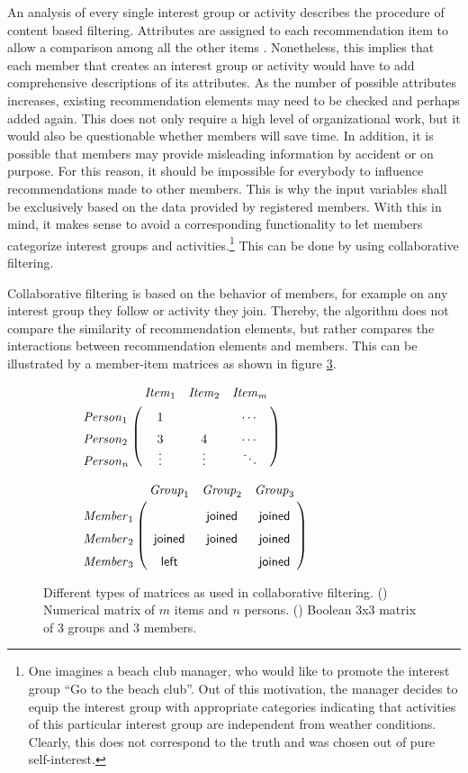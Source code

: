\documentclass[12pt,numbers=noenddot,parskip,bibliography=totocnumbered,listof=totocnumbered,draft]{scrreprt}
\begin{document}
An analysis of every single interest group or activity describes the procedure of content based filtering. Attributes are assigned to each recommendation item to allow a comparison among all the other items \citep[p.42]{klahold2009}. Nonetheless, this implies that each member that creates an interest group or activity would have to add comprehensive descriptions of its attributes. As the number of possible attributes increases, existing recommendation elements may need to be checked and perhaps added again. This does not only require a high level of organizational work, but it would also be questionable whether members will save time. In addition, it is possible that members may provide misleading information by accident or on purpose. For this reason, it should be impossible for everybody to influence recommendations made to other members. This is why the input variables shall be exclusively based on the data provided by registered members. With this in mind, it makes sense to avoid a corresponding functionality to let members categorize interest groups and activities.\footnote{One imagines a beach club manager, who would like to promote the interest group ``Go to the beach club''. Out of this motivation, the manager decides to equip the interest group with appropriate categories indicating that activities of this particular interest group are independent from weather conditions. Clearly, this does not correspond to the truth and was chosen out of pure self-interest.} This can be done by using collaborative filtering. 

Collaborative filtering is based on the behavior of members, for example on any interest group they follow or activity they join. \citep[p.62]{klahold2009} Thereby, the algorithm does not compare the similarity of recommendation elements, but rather compares the interactions between recommendation elements and members. This can be illustrated by a member-item matrices as shown in figure \ref{matrix}.

\begin{figure}
\begin{subfigure}[t]{0.5\textwidth}%
\centering
$\bordermatrix{~ & \mathit{Item}_1 & \mathit{Item}_2 & \mathit{Item}_m \cr
\vphantom{\vdots}\mathit{Person}_1 & 1 &  & \cdots  \cr
\vphantom{\vdots}\mathit{Person}_2 & 3 & 4 & \cdots \cr
\vphantom{\vdots}\mathit{Person}_n & \vdotswithin{3} & \vdotswithin{4} & \ddots  }$
\caption{}
\label{nummatrix}
\end{subfigure}%
\begin{subfigure}[t]{0.5\textwidth}%
\centering
$\bordermatrix{~ & \mathit{Group}_1 & \mathit{Group}_2 & \mathit{Group}_3 \cr
\vphantom{\vdots}\mathit{Member}_1 &  & \mathsf{joined} & \mathsf{joined} \cr
\vphantom{\vdots}\mathit{Member}_2 & \mathsf{joined} & \mathsf{joined} & \mathsf{joined} \cr
\vphantom{\vdots}\mathit{Member}_3 & \mathsf{left} &  & \mathsf{joined} }$
\caption{}
\label{boolmatrix}
\end{subfigure}%
\caption[Member-item matrices of collaborative filtering]{Different types of matrices as used in collaborative filtering. () Numerical matrix of $m$ items and $n$ persons. () Boolean 3x3 matrix of 3 groups and 3 members.}
\label{matrix}
\end{figure}
\end{document}
